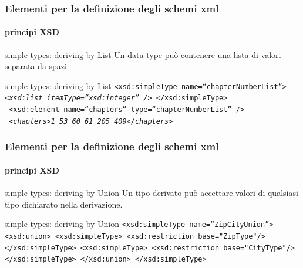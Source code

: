 \begin{frame}
	\frametitle{Elementi per la definizione degli schemi xml}
	\framesubtitle{principi XSD}
	\addtocounter{nframe}{1}

	\begin{block}{simple types: deriving by List}
		Un data type può contenere una lista di valori separata da spazi
	\end{block}

	\begin{block}{simple types: deriving by List}
		\texttt{<xsd:simpleType name=``chapterNumberList''>
			\emph{<xsd:list itemType=``xsd:integer'' />}
			</xsd:simpleType>}
		\\\texttt{
			<xsd:element name=``chapters'' type=``chapterNumberList'' />}
		\\\texttt{
			\textit{<chapters>1 53 60 61 205 409</chapters>}}
	\end{block}

\end{frame}

\begin{frame}
	\frametitle{Elementi per la definizione degli schemi xml}
	\framesubtitle{principi XSD}
	\addtocounter{nframe}{1}

	\begin{block}{simple types: deriving by Union}
		Un tipo derivato può accettare valori di qualsiasi tipo dichiarato nella derivazione.
	\end{block}

	\begin{block}{simple types: deriving by Union}
		\texttt{<xsd:simpleType name=``ZipCityUnion''>
			<xsd:union>
			<xsd:simpleType>
			<xsd:restriction base="ZipType"/>
			</xsd:simpleType>
			<xsd:simpleType>
			<xsd:restriction base="CityType"/>
			</xsd:simpleType>
			</xsd:union>
			</xsd:simpleType>}

	\end{block}

\end{frame}





